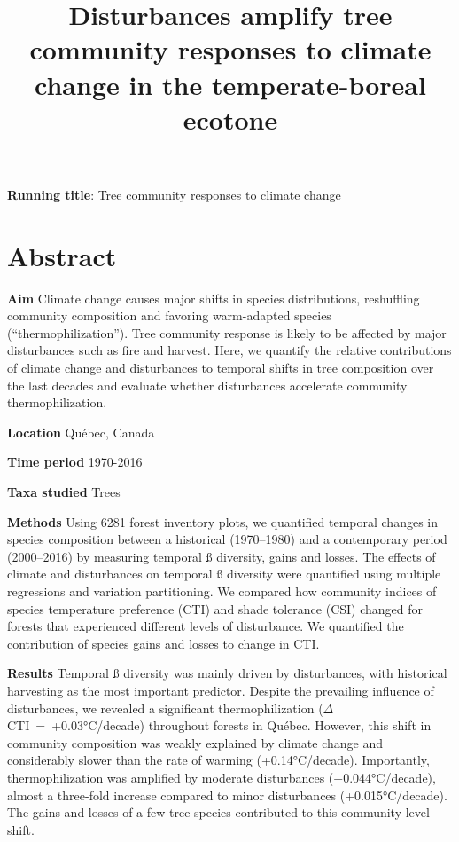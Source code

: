 \documentclass[a4paperpaper,]{article}
\title{Disturbances amplify tree community responses to climate change in the
temperate-boreal ecotone}
\date{}
\begin{document}
\maketitle

\textbf{Running title}: Tree community responses to climate change

\hypertarget{abstract}{%
\section{Abstract}\label{abstract}}

\textbf{Aim} Climate change causes major shifts in species
distributions, reshuffling community composition and favoring
warm-adapted species (``thermophilization''). Tree community response is
likely to be affected by major disturbances such as fire and harvest.
Here, we quantify the relative contributions of climate change and
disturbances to temporal shifts in tree composition over the last
decades and evaluate whether disturbances accelerate community
thermophilization.

\textbf{Location} Québec, Canada

\textbf{Time period} 1970-2016

\textbf{Taxa studied} Trees

\textbf{Methods} Using 6281 forest inventory plots, we quantified
temporal changes in species composition between a historical
(1970--1980) and a contemporary period (2000--2016) by measuring
temporal ß diversity, gains and losses. The effects of climate and
disturbances on temporal ß diversity were quantified using multiple
regressions and variation partitioning. We compared how community
indices of species temperature preference (CTI) and shade tolerance
(CSI) changed for forests that experienced different levels of
disturbance. We quantified the contribution of species gains and losses
to change in CTI.

\textbf{Results} Temporal ß diversity was mainly driven by disturbances,
with historical harvesting as the most important predictor. Despite the
prevailing influence of disturbances, we revealed a significant
thermophilization (\(\Delta\)CTI~=~+0.03°C/decade) throughout forests in
Québec. However, this shift in community composition was weakly
explained by climate change and considerably slower than the rate of
warming (+0.14°C/decade). Importantly, thermophilization was amplified
by moderate disturbances (+0.044°C/decade), almost a three-fold increase
compared to minor disturbances (+0.015°C/decade). The gains and losses
of a few tree species contributed to this community-level shift.
\end{document}
